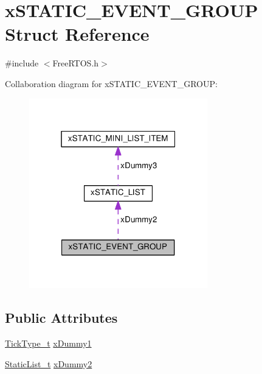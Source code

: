 \hypertarget{structx_s_t_a_t_i_c___e_v_e_n_t___g_r_o_u_p}{}\section{x\+S\+T\+A\+T\+I\+C\+\_\+\+E\+V\+E\+N\+T\+\_\+\+G\+R\+O\+UP Struct Reference}
\label{structx_s_t_a_t_i_c___e_v_e_n_t___g_r_o_u_p}


{\ttfamily \#include $<$Free\+R\+T\+O\+S.\+h$>$}



Collaboration diagram for x\+S\+T\+A\+T\+I\+C\+\_\+\+E\+V\+E\+N\+T\+\_\+\+G\+R\+O\+UP\+:\nopagebreak
\begin{figure}[H]
\begin{center}
\leavevmode
\includegraphics[width=220pt]{structx_s_t_a_t_i_c___e_v_e_n_t___g_r_o_u_p__coll__graph}
\end{center}
\end{figure}
\subsection*{Public Attributes}
\begin{DoxyCompactItemize}
\item 
\hyperlink{portmacro_8h_aa69c48c6e902ce54f70886e6573c92a9}{Tick\+Type\+\_\+t} \hyperlink{structx_s_t_a_t_i_c___e_v_e_n_t___g_r_o_u_p_a4ed0094f715dd8f79a354f42fd973fc6}{x\+Dummy1}
\item 
\hyperlink{_free_r_t_o_s_8h_a9735ad9101a2bd25f83a62089a4acee6}{Static\+List\+\_\+t} \hyperlink{structx_s_t_a_t_i_c___e_v_e_n_t___g_r_o_u_p_a17d070c972ecd0151d7505a539653551}{x\+Dummy2}
\end{DoxyCompactItemize}


